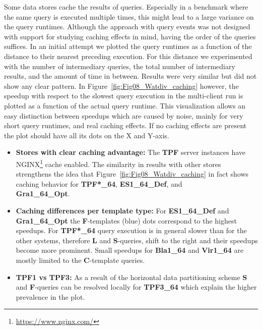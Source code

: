 Some data stores cache the results of queries. Especially in a benchmark where the same query is executed multiple times, this might lead to a large variance on the query runtimes. Although the approach with query events was not designed with support for studying caching effects in mind, having the order of the queries suffices. 
In an initial attempt we plotted the query runtimes as a function of the distance to their nearest preceding execution. For this distance we experimented with the number of intermediary queries, the total number of intermediary results, and the amount of time in between. Results were very similar but did not show any clear pattern. 
In Figure~\ref{fig:Fig08_Watdiv_caching} however, the speedup with respect to the slowest query execution in the multi-client run is plotted as a function of the actual query runtime. This visualization allows an easy distinction between speedups which are caused by noise, mainly for very short query runtimes, and real caching effects. If no caching effects are present the plot should have all its dots on the X and Y-axis.
\begin{itemize}
	\item \textbf{Stores with clear caching advantage:} The \textbf{TPF} server instances have NGINX\footnote{\scriptsize \url{https://www.nginx.com/}} cache enabled. The similarity in results with other stores strengthens the idea that Figure~\ref{fig:Fig08_Watdiv_caching} in fact shows caching behavior for 
	\textbf{TPF*\_64}, \textbf{ES1\_64\_Def}, and \\ \textbf{Gra1\_64\_Opt}.
	
	\item \textbf{Caching differences per template type:} For \textbf{ES1\_64\_Def} and \textbf{Gra1\_64\_Opt} the \textbf{F}-templates (blue) dots correspond to the highest speedups. For \textbf{TPF*\_64} query execution is in general slower than for the other systems, therefore \textbf{L} and \textbf{S}-queries, shift to the right and their speedups become more prominent. Small speedups for \textbf{Bla1\_64} and \textbf{Vir1\_64} are mostly limited to the \textbf{C}-template queries.
	\item \textbf{TPF1 vs TPF3:} As a result of the horizontal data partitioning scheme \textbf{S} and \textbf{F}-queries can be resolved locally for \textbf{TPF3\_64} which explain the higher prevalence in the plot.
\end{itemize}






